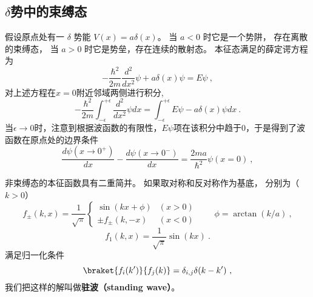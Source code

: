 
\begin{issues}
\issueDraft
\end{issues}

\subsection{$\delta$势中的束缚态}
假设原点处有一 $\delta$ 势能 $V(x) = a\delta(x)$。 当 $a < 0$ 时它是一个势阱， 存在离散的束缚态， 当 $a > 0$ 时它是势垒，存在连续的散射态。
本征态满足的薛定谔方程为
\begin{equation}
-\frac{\hbar^2}{2m}\frac{d^2}{dx^2}\psi + a\delta(x)\psi = E\psi ~,
\end{equation}
对上述方程在$x=0$附近邻域两侧进行积分,
\begin{equation}
-\frac{\hbar^2}{2m}\int_{-\epsilon}^{+\epsilon} \frac{d^2}{dx^2}\psi dx = \int_{-\epsilon}^{+\epsilon}E\psi - a\delta(x)\psi dx~.
\end{equation}
当$\epsilon\rightarrow 0$时，注意到根据波函数的有限性，$E\psi$项在该积分中趋于0，于是得到了波函数在原点处的边界条件
\begin{equation}
\frac{d \psi(x\rightarrow 0^+)}{dx}-\frac{d\psi(x \rightarrow 0^-)}{dx} = \frac{2ma}{\hbar^2} \psi(x=0)~,
\end{equation}

非束缚态的本征函数具有二重简并。 如果取对称和反对称作为基底， 分别为（$k > 0$）
\begin{equation}
f_\pm(k, x) = \frac{1}{\sqrt{\pi}}
\begin{cases}
\sin(kx + \phi) & (x > 0)\\
\pm f_\pm(k, -x) & (x < 0)
\end{cases}
\qquad  \phi = \arctan(k/a)~,
\end{equation}
\begin{equation}
f_1(k, x) = \frac{1}{\sqrt{\pi}}\sin(kx)~.
\end{equation}
满足归一化条件
\begin{equation}\label{eq_Dsc1D_4}
\braket{f_i(k')}{f_j(k)} = \delta_{i,j} \delta(k - k')~,
\end{equation}
我们把这样的解叫做\textbf{驻波（standing wave）}。

